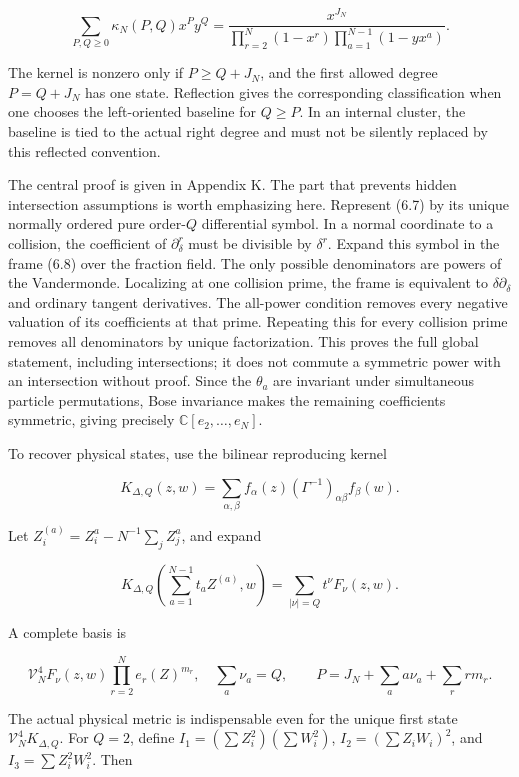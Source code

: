 \[
\boxed{\displaystyle
\sum_{P,Q\ge0}\kappa_N(P,Q)x^Py^Q
=\frac{x^{J_N}}
{\prod_{r=2}^N(1-x^r)\prod_{a=1}^{N-1}(1-yx^a)}.}
\tag{6.10}
\]

The kernel is nonzero only if \(P\ge Q+J_N\), and the first allowed degree \(P=Q+J_N\) has one state. Reflection gives the corresponding classification when one chooses the left-oriented baseline for \(Q\ge P\). In an internal cluster, the baseline is tied to the actual right degree and must not be silently replaced by this reflected convention.

The central proof is given in Appendix K. The part that prevents hidden intersection assumptions is worth emphasizing here. Represent (6.7) by its unique normally ordered pure order-\(Q\) differential symbol. In a normal coordinate to a collision, the coefficient of \(\partial_\delta^r\) must be divisible by \(\delta^r\). Expand this symbol in the frame (6.8) over the fraction field. The only possible denominators are powers of the Vandermonde. Localizing at one collision prime, the frame is equivalent to \(\delta\partial_\delta\) and ordinary tangent derivatives. The all-power condition removes every negative valuation of its coefficients at that prime. Repeating this for every collision prime removes all denominators by unique factorization. This proves the full global statement, including intersections; it does not commute a symmetric power with an intersection without proof. Since the \(\theta_a\) are invariant under simultaneous particle permutations, Bose invariance makes the remaining coefficients symmetric, giving precisely \(\mathbb C[e_2,\ldots,e_N]\).

To recover physical states, use the bilinear reproducing kernel

\[
K_{\Delta,Q}(z,w)=\sum_{\alpha,\beta}
f_\alpha(z)(\Gamma^{-1})_{\alpha\beta}f_\beta(w).
\tag{6.11}
\]

Let \(Z_i^{(a)}=Z_i^a-N^{-1}\sum_jZ_j^a\), and expand

\[
K_{\Delta,Q}\!\left(\sum_{a=1}^{N-1}t_aZ^{(a)},w\right)
=\sum_{|\nu|=Q}t^\nu F_\nu(z,w).
\tag{6.12}
\]

A complete basis is

\[
\mathcal V_N^4F_\nu(z,w)\prod_{r=2}^N e_r(Z)^{m_r},
\quad
\sum_a\nu_a=Q,\qquad
P=J_N+\sum_a a\nu_a+\sum_r rm_r.
\tag{6.13}
\]

The actual physical metric is indispensable even for the unique first state \(\mathcal V_N^4K_{\Delta,Q}\). For \(Q=2\), define \(I_1=(\sum Z_i^2)(\sum W_i^2)\), \(I_2=(\sum Z_iW_i)^2\), and \(I_3=\sum Z_i^2W_i^2\). Then

